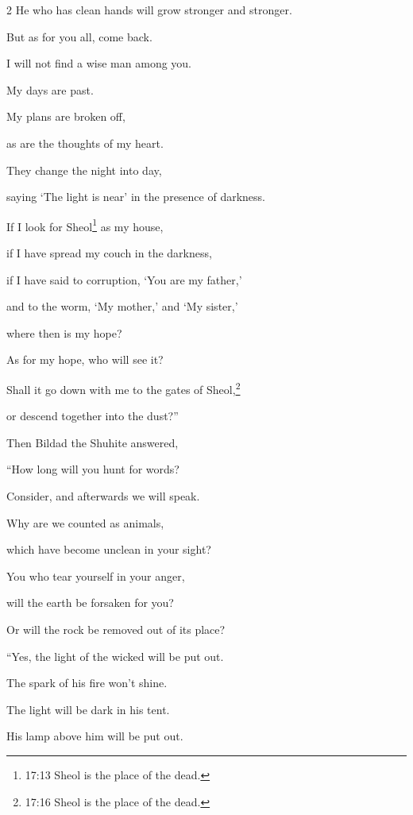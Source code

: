\begin{multicols}{2}
	He who has clean hands will grow stronger and stronger.
	
	\myverse{}But as for you all, come back.
	
	I will not find a wise man among you.
	
	\myverse{}My days are past.
	
	My plans are broken off,
	
	as are the thoughts of my heart.
	
	\myverse{}They change the night into day,
	
	saying ‘The light is near’ in the presence of darkness.
	
	\myverse{}If I look for Sheol\footnote{17:13 Sheol is the place of the dead.} as my house,
	
	if I have spread my couch in the darkness,
	
	\myverse{}if I have said to corruption, ‘You are my father,’
	
	and to the worm, ‘My mother,’ and ‘My sister,’
	
	\myverse{}where then is my hope?
	
	As for my hope, who will see it?
	
	\myverse{}Shall it go down with me to the gates of Sheol,\footnote{17:16 Sheol is the place of the dead.}
	
	or descend together into the dust?”
	
	
	
	\mychapter{} \myverse*{}Then Bildad the Shuhite answered,
	
	\quad\quad \myverse{}“How long will you hunt for words?
	
	Consider, and afterwards we will speak.
	
	\myverse{}Why are we counted as animals,
	
	which have become unclean in your sight?
	
	\myverse{}You who tear yourself in your anger,
	
	will the earth be forsaken for you?
	
	Or will the rock be removed out of its place?
	
	\vspace{\baselineskip}
	
	\myverse{}“Yes, the light of the wicked will be put out.
	
	The spark of his fire won’t shine.
	
	\myverse{}The light will be dark in his tent.
	
	His lamp above him will be put out.
	

\end{multicols}
